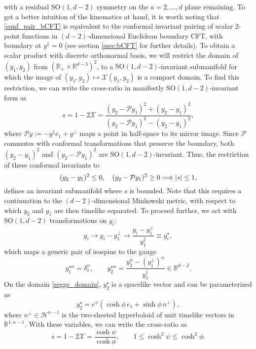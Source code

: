 \documentclass{article}
\def \dg {\delta}
\def \ag {\alpha}
\def \Rs {\mathbb{R}}
\begin{document}
with a residual $\mathrm{SO}(1,d-2)$ symmetry on the $a=2,\dots , d$ plane remaining. To get a better intuition of the kinematics at hand, it is worth noting that \eqref{conf_pair_bCFT} is equivalent to the conformal invariant pairing of scalar 2-point functions in $(d-2)$-dimensional Euclidean boundary CFT, with boundary at $y^{\parallel} = 0$ (see section \ref{ssec:bCFT} for further details). To obtain a scalar product with discrete orthonormal basis, we will restrict the domain of $(y_1,y_2)$ from $(\Rs_+ \times \Rs^{d-3})^2$, to a $\mathrm{SO}(1,d-2)$-invariant submanifold for which the image of $(y_1,y_2) \mapsto \mathcal{X}(y_1,y_2)$ is a compact domain. To find this restriction, we can write the cross-ratio in manifestly $\mathrm{SO}(1,d-2)$-invariant form as
\begin{equation}
s = 1-2 \mathcal{X} = \frac{ (y_2-\mathcal{P}y_1)^2+(y_2-y_1)^2}{ (y_2-\mathcal{P}y_1)^2-(y_2-y_1)^2},
\end{equation}
where $\mathcal{P}y := - y^{\parallel} e_1 + y^{\perp}$ maps a point in half-space to its mirror image. Since $\mathcal{P}$ commutes with conformal transformations that preserve the boundary, both $(y_2-y_1)^2$ and $(y_2-\mathcal{P}y_1)^2$ are $\mathrm{SO}(1,d-2)$-invariant. Thus, the restriction of these conformal invariants to
\begin{equation}
(y_2-y_1)^2 \leq 0, \quad (y_2-\mathcal{P}y_1)^2 \geq 0 \Longrightarrow  \abs{s} \leq 1,
\label{regge_domain}
\end{equation}
defines an invariant submanifold where $s$ is bounded. Note that this requires a continuation to the $(d-2)$-dimensional Minkowski metric, with respect to which $y_2$ and $y_1$ are then timelike separated. To proceed further, we act with $\mathrm{SO}(1,d-2)$ transformations on $y_i$:
\begin{equation}
    y_i \rightarrow y_i -y_1^{\perp} \rightarrow \frac{y_i-y_1^{\perp}}{y_1^{\parallel}} \equiv y_i^{\star}, 
\end{equation}
which maps a generic pair of isospins to the gauge
\begin{equation}
    y_1^{\star \ag} \!= \dg^{\ag}_1, \qquad y_2^{\star \ag} \!= \frac{y^{\ag}_2-(y_1^{\perp})^{\ag}}{y_1^{\parallel}} \in \Rs^{d-2}.
    \label{gauge_phi_theta_n}
\end{equation}
On the domain \eqref{regge_domain}, $y_2^{\star}$ is a spacelike vector and can be parameterized as \begin{equation}
y_2^{\star} = e^{\psi} \left( \cosh \phi \, e_1 + \sinh\phi\, n^{\perp} \right),
\end{equation}
where $n^{\perp} \in \mathcal{H}^{n-1}$ is the two-sheeted hyperboloid of unit timelike vectors in $\Rs^{1,n-1}$. With these variables, we can write the cross-ratio as
\begin{equation}
    s = 1-2\mathcal{X} = \frac{\cosh\psi}{\cosh \phi}, \qquad  1 \leq \cosh^2 \psi \leq  \cosh^2 \phi.
    \end{equation}
    
\end{document}
